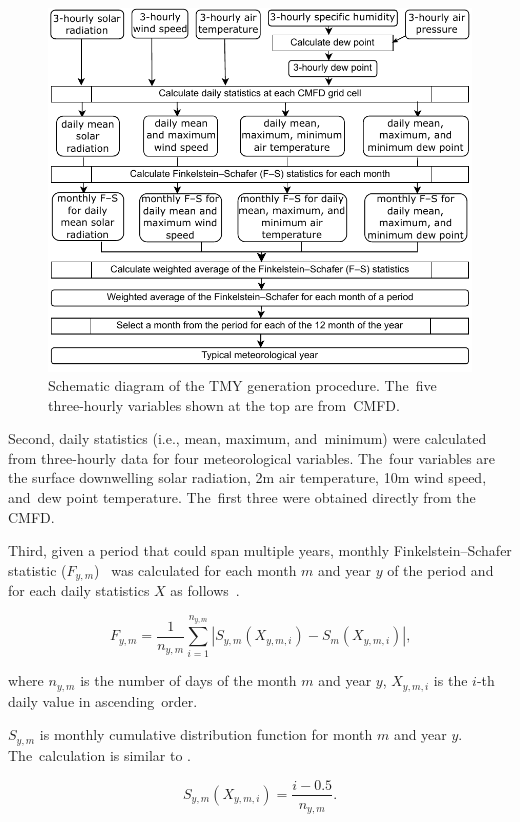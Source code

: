 \documentclass[atmosphere,article,accept,pdftex,moreauthors]{Definitions/mdpi}
\begin{document}
\begin{figure}[H]
  \includegraphics[width=13.8cm]{fig/diagram.pdf}
  \caption{Schematic diagram of the TMY generation procedure. The~five three-hourly variables shown at the top are from~CMFD.\label{fig:diagram}}
\end{figure}

Second, daily statistics (i.e., mean, maximum, and~minimum) were calculated from three-hourly data for four meteorological variables. The~four variables are the surface downwelling solar radiation, 2m air temperature, 10m wind speed, and~dew point temperature. The~first three were obtained directly from the CMFD\@.

Third, given a period that could span multiple years, monthly Finkelstein--Schafer statistic (\(F_{y,m}\))~\cite{finkelstein1971B} was calculated for each month \(m\) and year \(y\) of the period and for each daily statistics \(X\) as follows~\cite{GBT42766-2023}.
\begin{linenomath}
  \begin{equation}
    F_{y,m} = \frac{1}{n_{y,m}} \sum_{i=1}^{n_{y,m}} |S_{y,m}(X_{y,m,i}) - S_m(X_{y,m,i})| \text{,}
  \end{equation}
\end{linenomath}
where \(n_{y,m}\) is the number of days of the month \(m\) and year \(y\), \(X_{y,m,i}\) is the \(i\)-th daily value in ascending~order.

\(S_{y,m}\) is monthly cumulative distribution function for month \(m\) and year \(y\). The~calculation is similar to .
\begin{linenomath}
  \begin{equation}\label{eq:cdf_mon}
    S_{y,m}(X_{y,m,i}) = \frac{i - 0.5}{n_{y,m}} \text{.}
  \end{equation}
\end{linenomath}
\end{document}
